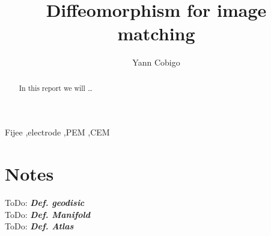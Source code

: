 \documentclass[final, paper=letter,5p,times,twocolumn]{elsarticle}
\newcommand{\ToDo}[1]{ToDo: \textbf{\textit{#1}}}
\theoremstyle{definition}
\begin{document}
\begin{frontmatter}

\title{Diffeomorphism for image matching}

\author[label1]{Yann Cobigo}
\address[label1]{University of California, San Francisco | ucsf.edu}




\begin{abstract}
In this report we will \dots
\end{abstract}

\begin{keyword}
Fijee \sep electrode \sep PEM \sep CEM
\end{keyword}

\end{frontmatter}


\section{Notes}

\ToDo{Def. geodisic} \\
\ToDo{Def. Manifold} \\
\ToDo{Def. Atlas} \\
\end{document}
